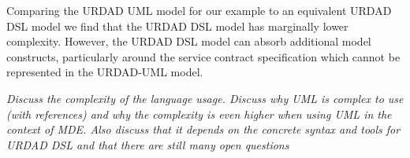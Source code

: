 Comparing the URDAD UML model for our example to an equivalent URDAD DSL model we find that the URDAD DSL model has marginally lower complexity. However, the URDAD DSL model can absorb additional model constructs, particularly around the service contract specification which cannot be represented in the URDAD-UML model.

\emph{Discuss the complexity of the language usage. Discuss why UML is complex to use (with references) and why the complexity is even higher when using UML in the context of MDE. Also discuss that it depends on the concrete syntax and tools for URDAD DSL and that there are still many open questions}
